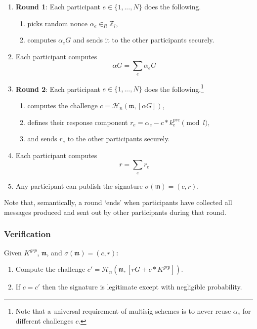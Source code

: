 \begin{enumerate}
    \item \textbf{Round 1}: Each participant $e \in \{1,...,N\}$ does the following.
    \begin{enumerate}
        \item picks random nonce $\alpha_e \in_R \mathbb{Z}_l$,
        \item computes $\alpha_e G$ and sends it to the other participants securely.
    \end{enumerate}

    \item Each participant computes 
    \[ \alpha G = \sum_e \alpha_e G \]

    \item \textbf{Round 2}: Each participant $e \in \{1,...,N\}$ does the following.\footnote{Note that a universal requirement of multisig schemes is to never reuse $\alpha_e$ for different challenges $c$.}
    \begin{enumerate}
        \item computes the challenge $c = \mathcal{H}_n(\mathfrak{m},[\alpha G])$,
        \item defines their response component $r_e = \alpha_e - c*k^{pre}_e \pmod l$,
        \item and sends $r_e$ to the other participants securely.
    \end{enumerate}

    \item Each participant computes 
    \[ r = \sum_e r_e\]
    \item Any participant can publish the signature $\sigma(\mathfrak{m}) = (c, r)$.
\end{enumerate}

Note that, semantically, a round `ends' when participants have collected all messages produced and sent out by other participants during that round.

\subsubsection*{Verification}

Given $K^{grp}$, $\mathfrak{m}$, and $\sigma(\mathfrak{m}) = (c,r)$:
\begin{enumerate}
    \item Compute the challenge $c' = \mathcal{H}_n(\mathfrak{m},[r G + c*K^{grp}])$.

    \item If $c = c'$ then the signature is legitimate except with negligible probability.
\end{enumerate}




